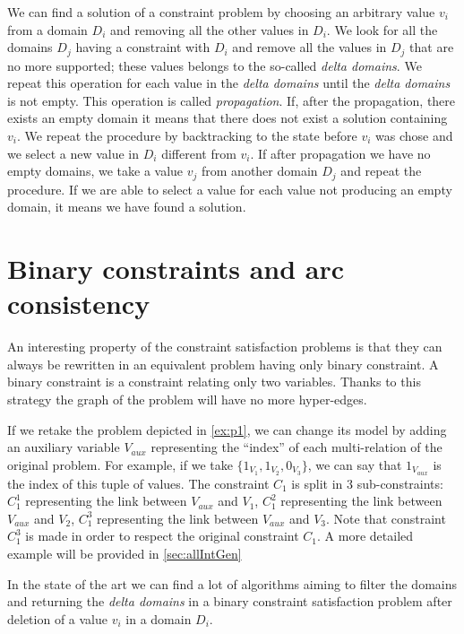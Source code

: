 \documentclass{rapport}
\begin{document}
We can find a solution of a constraint problem by choosing an arbitrary value $v_i$ from a domain $D_i$ and removing all the other values in $D_i$. We look for all the domains $D_j$ having a constraint with $D_i$ and remove all the values in $D_j$ that are no more supported; these values belongs to the so-called \textit{delta domains}. We repeat this operation for each value in the \textit{delta domains} until the \textit{delta domains} is not empty. This operation is called \textit{propagation}. If, after the propagation, there exists an empty domain it means that there does not exist a solution containing $v_i$. We repeat the procedure by backtracking to the state before $v_i$ was chose and we select a new value in $D_i$ different from $v_i$. If after propagation we have no empty domains, we take a value $v_j$ from another domain $D_j$ and repeat the procedure. If we are able to select a value for each value not producing an empty domain, it means we have found a solution.

\section{Binary constraints and arc consistency}

An interesting property of the constraint satisfaction problems is that they can always be rewritten in an equivalent problem having only binary constraint. A binary constraint is a constraint relating only two variables. Thanks to this strategy the graph of the problem will have no more hyper-edges.

\begin{example}
  If we retake the problem depicted in \cref{ex:p1}, we can change its model by adding an auxiliary variable $V_{aux}$ representing the ``index'' of each multi-relation of the original problem. For example, if we take $\{1_{V_1}, 1_{V_2}, 0_{V_3}\}$, we can say that $1_{V_{aux}}$ is the index of this tuple of values. The constraint $C_1$ is split in $3$ sub-constraints: $C_1^1$ representing the link between $V_{aux}$ and $V_1$, $C_1^2$ representing the link between $V_{aux}$ and $V_2$, $C_1^3$ representing the link between $V_{aux}$ and $V_3$. Note that constraint $C_1^3$ is made in order to respect the original constraint $C_1$. A more detailed example will be provided in \cref{sec:allIntGen}
\end{example}

In the state of the art we can find a lot of algorithms aiming to filter the domains and returning the \textit{delta domains} in a binary constraint satisfaction problem after deletion of a value $v_i$ in a domain $D_i$.
\end{document}
